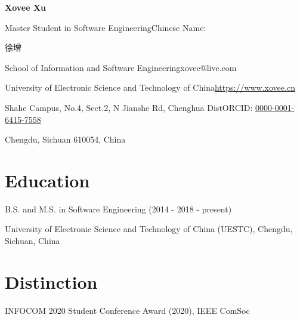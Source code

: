 \documentclass{article}
\begin{document}
\begin{center}
    \Huge{
    \textbf{Xovee Xu}}
\end{center}



\noindent Master Student in Software Engineering\hfill Chinese Name: \begin{CJK*}{UTF8}{gkai}徐增\end{CJK*}

\noindent School of Information and Software Engineering\hfill xovee@live.com

\noindent University of Electronic Science and Technology of China\hfill \url{https://www.xovee.cn}

\noindent Shahe Campus, No.4, Sect.2, N Jianshe Rd, Chenghua Dist\hfill ORCID: \href{https://orcid.org/0000-0001-6415-7558}{0000-0001-6415-7558}

\noindent Chengdu, Sichuan 610054, China

\setlength{\parskip}{3pt}


\vspace{-8pt}
\section*{Education}
\vspace{-4pt}
\indent 


B.S. and M.S. in Software Engineering (2014 - 2018 - present)

University of Electronic Science and Technology of China (UESTC), Chengdu, Sichuan, China


\vspace{-8pt}
\section*{Distinction}
\vspace{-4pt}
\indent

INFOCOM 2020 Student Conference Award (2020), IEEE ComSoc
\end{document}
